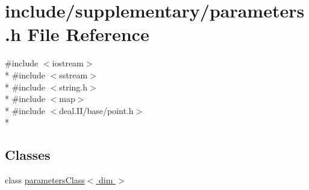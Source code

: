 \section{include/supplementary/parameters.h File Reference}
\label{parameters_8h}
{\ttfamily \#include $<$iostream$>$}\\*
{\ttfamily \#include $<$sstream$>$}\\*
{\ttfamily \#include $<$string.\-h$>$}\\*
{\ttfamily \#include $<$map$>$}\\*
{\ttfamily \#include $<$deal.\-I\-I/base/point.\-h$>$}\\*
\subsection*{Classes}
\begin{DoxyCompactItemize}
\item 
class \hyperlink{classparameters_class}{parameters\-Class$<$ dim $>$}
\end{DoxyCompactItemize}
